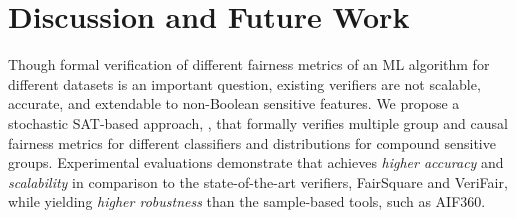 \section{Discussion and Future Work}
Though formal verification of different fairness metrics of an ML algorithm for different datasets is an important question, existing verifiers are not scalable, accurate, and extendable to non-Boolean sensitive features. We propose a stochastic SAT-based approach, {\justicia}, that formally verifies multiple group and causal fairness metrics for different classifiers and distributions for compound sensitive groups.
Experimental evaluations demonstrate that {\justicia} achieves \textit{higher accuracy} and \textit{scalability} in comparison to the state-of-the-art verifiers, FairSquare and VeriFair, while yielding \textit{higher robustness} than the sample-based tools, such as AIF360.


